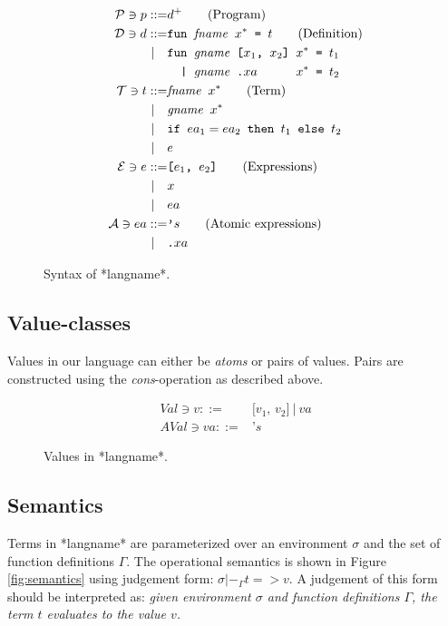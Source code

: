 \documentclass[10pt]{../sigplanconf}
\begin{document}
\begin{figure}\centering
  \begin{align*}
    \mathcal{P} \ni p ::= & d^{+}\tag{Program}\\
    \mathcal{D} \ni d ::= &\texttt{fun \textit{\rmfamily fname} $x^{*}$ = $t$}  \tag{Definition} \\
    | \quad &\texttt{fun \textit{\rmfamily gname} [$x_1$, $x_2$] $x^{*}$ = $t_1$} \\
    & \texttt{\ \ | \textit{\rmfamily gname}\ \texttt{.}$xa$ \hspace{.7cm} $x^{*}$ = $t_2$}\\
    \mathcal{T} \ni t ::= & \texttt{\textit{\rmfamily fname} $x^{*}$}  \tag{Term}\\
    | \quad & \texttt{\textit{\rmfamily gname} $x^{*}$} \\
    | \quad & \texttt{if $ea_1 = ea_2$ then $t_1$ else $t_2$} \\
    | \quad & e \\
    \mathcal{E} \ni e ::= & \texttt{[$e_1$, $e_2$]} \tag{Expressions}\\
    | \quad & x \\
    | \quad & ea \\
    \mathcal{A} \ni ea ::= & \texttt{'}s \tag{Atomic expressions}\\
    | \quad & \texttt{.}xa
  \end{align*}
  \caption{Syntax of *langname*.}
\label{fig:bnf}
\end{figure}

\subsection{Value-classes}


Values in our language can either be \textit{atoms} or pairs of
values. Pairs are constructed using the \textit{cons}-operation as
described above.

\begin{figure}\centering
  \begin{align*}
    Val \ni v ::= & \texttt{[$v_1$, $v_2$]}\ |\ va\\
    AVal \ni va ::= & \texttt{'}s
  \end{align*}
  \caption{Values in *langname*.}
\label{fig:bnf}
\end{figure}

\subsection{Semantics}
Terms in *langname* are parameterized over an environment $\sigma$ and
the set of function definitions $\Gamma$. The operational semantics is
shown in Figure \ref{fig:semantics} using judgement form: $\sigma
|-_\Gamma t => v$. A judgement of this form should be interpreted as:
\textit{given environment $\sigma$ and function definitions $\Gamma$,
  the term $t$ evaluates to the value $v$.}
\end{document}
